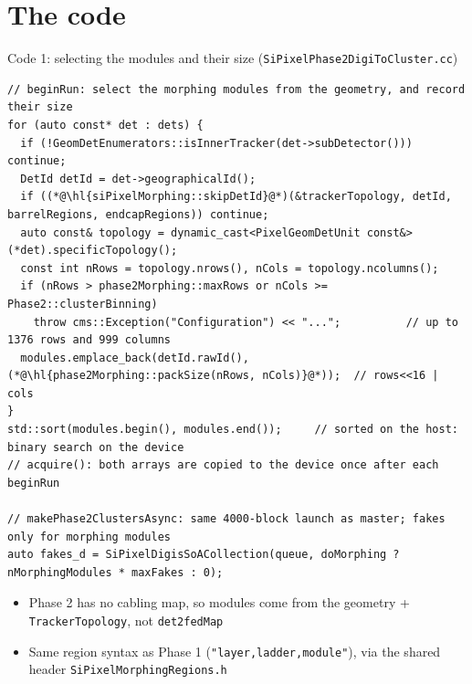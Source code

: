 \documentclass[aspectratio=169,10pt,xcolor=table]{beamer}
\newcommand{\code}[1]{\texttt{\small #1}}
\newcommand{\hl}[1]{\colorbox{cbOrange!25}{#1}}
\begin{document}
\section{The code}
\begin{frame}[fragile]{Code 1: selecting the modules and their size (\code{SiPixelPhase2DigiToCluster.cc})}
\begin{lstlisting}
// beginRun: select the morphing modules from the geometry, and record their size
for (auto const* det : dets) {
  if (!GeomDetEnumerators::isInnerTracker(det->subDetector())) continue;
  DetId detId = det->geographicalId();
  if ((*@\hl{siPixelMorphing::skipDetId}@*)(&trackerTopology, detId, barrelRegions, endcapRegions)) continue;
  auto const& topology = dynamic_cast<PixelGeomDetUnit const&>(*det).specificTopology();
  const int nRows = topology.nrows(), nCols = topology.ncolumns();
  if (nRows > phase2Morphing::maxRows or nCols >= Phase2::clusterBinning)
    throw cms::Exception("Configuration") << "...";          // up to 1376 rows and 999 columns
  modules.emplace_back(detId.rawId(), (*@\hl{phase2Morphing::packSize(nRows, nCols)}@*));  // rows<<16 | cols
}
std::sort(modules.begin(), modules.end());     // sorted on the host: binary search on the device
// acquire(): both arrays are copied to the device once after each beginRun

// makePhase2ClustersAsync: same 4000-block launch as master; fakes only for morphing modules
auto fakes_d = SiPixelDigisSoACollection(queue, doMorphing ? nMorphingModules * maxFakes : 0);
\end{lstlisting}
  \begin{itemize}\small
    \item Phase 2 has no cabling map, so modules come from the geometry + \code{TrackerTopology}, not \code{det2fedMap}
    \item Same region syntax as Phase 1 (\code{"layer,ladder,module"}), via the shared header \code{SiPixelMorphingRegions.h}
  \end{itemize}
\end{frame}
\end{document}
